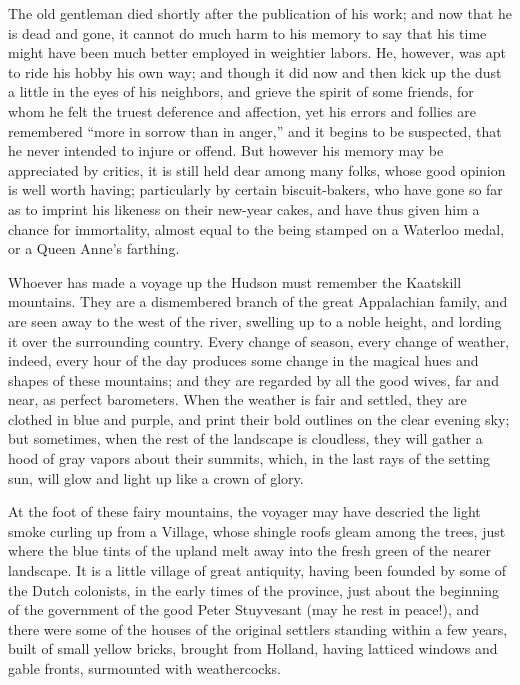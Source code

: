 The old gentleman died shortly after the publication of his work; and now that he is dead and gone, it cannot do much harm to his memory to say that his time might have been much better employed in weightier labors. He, however, was apt to ride his hobby his own way; and though it did now and then kick up the dust a little in the eyes of his neighbors, and grieve the spirit of some friends, for whom he felt the truest deference and affection, yet his errors and follies are remembered “more in sorrow than in anger,” and it begins to be suspected, that he never intended to injure or offend. But however his memory may be appreciated by critics, it is still held dear among many folks, whose good opinion is well worth having; particularly by certain biscuit-bakers, who have gone so far as to imprint his likeness on their new-year cakes, and have thus given him a chance for immortality, almost equal to the being stamped on a Waterloo medal, or a Queen Anne’s farthing.

\cleardoublepage

\noindent
Whoever has made a voyage up the Hudson must remember the Kaatskill mountains. They are a dismembered branch of the great Appalachian family, and are seen away to the west of the river, swelling up to a noble height, and lording it over the surrounding country. Every change of season, every change of weather, indeed, every hour of the day produces some change in the magical hues and shapes of these mountains; and they are regarded by all the good wives, far and near, as perfect barometers. When the weather is fair and settled, they are clothed in blue and purple, and print their bold outlines on the clear evening sky; but sometimes, when the rest of the landscape is cloudless, they will gather a hood of gray vapors about their summits, which, in the last rays of the setting sun, will glow and light up like a crown of glory.

At the foot of these fairy mountains, the voyager may have descried the light smoke curling up from a Village, whose shingle roofs gleam among the trees, just where the blue tints of the upland melt away into the fresh green of the nearer landscape. It is a little village of great antiquity, having been founded by some of the Dutch colonists, in the early times of the province, just about the beginning of the government of the good Peter Stuyvesant (may he rest in peace!), and there were some of the houses of the original settlers standing within a few years, built of small yellow bricks, brought from Holland, having latticed windows and gable fronts, surmounted with weathercocks.

